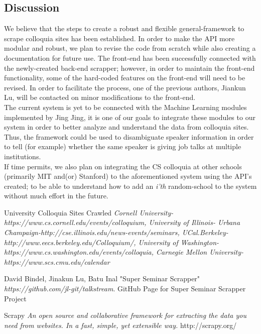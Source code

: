 \documentclass[a4paper,11pt]{article}
\begin{document}
\begin{multicols}{2}
\section{Discussion}
    We believe that the steps to create a robust and flexible general-framework to scrape colloquia sites has been established. In order to make the API more modular and robust, we plan to revise the code from scratch while also creating a documentation for future use. The front-end has been successfully connected with the newly-created back-end scrapper; however, in order to maintain the front-end functionality, some of the hard-coded features on the front-end will need to be revised. In order to facilitate the process, one of the previous authors, Jiankun Lu, will be contacted on minor modifications to the front-end. \\
 The current system is yet to be connected with the Machine Learning modules implemented by Jing Jing, it is one of our goals to integrate these modules to our system in order to better analyze and understand the data from colloquia sites. Thus, the framework could be used to disambiguate speaker information in order to tell (for example) whether the same speaker is giving job talks at multiple institutions. \\
 If time permits, we also plan on integrating the CS colloquia at other schools (primarily MIT and(or) Stanford) to the aforementioned system using the API's created; to be able to understand how to add an \textit{i'th } random-school to the system without much effort in the future.
\end{multicols}

\newpage
\begin{thebibliography}{9}
 University Colloquia Sites Crawled
\textit{Cornell University- https://www.cs.cornell.edu/events/colloquium, University of Illinois- Urbana Champaign-http://cse.illinois.edu/news-events/seminars, UCal.Berkeley- http://www.eecs.berkeley.edu/Colloquium/, University of Washington- https://www.cs.washington.edu/events/colloquia, Carnegie Mellon University- https://www.scs.cmu.edu/calendar}

 David Bindel, Jinakun Lu, Batu Inal
 "Super Seminar Scrapper"
\textit{https://github.com/jl-git/talkstream}. GitHub Page for Super Seminar Scrapper Project
 
 Scrapy 
\textit{An open source and collaborative framework for extracting the data you need from websites. In a fast, simple, yet extensible way.} http://scrapy.org/
\end{thebibliography}
\end{document}
